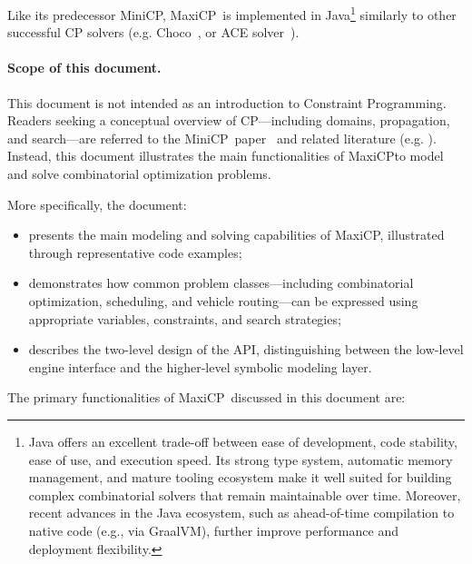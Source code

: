 \documentclass[11pt, a4paper]{scrartcl}
\newcommand{\choco}{\textsf{Choco}}
\newcommand{\maxicp}{\textsf{MaxiCP}}
\newcommand{\minicp}{\textsf{MiniCP}}
\begin{document}
Like its predecessor \minicp, \maxicp\ is implemented in Java\footnote{Java offers an excellent trade-off between ease of development, code stability, ease of use, and execution speed.
Its strong type system, automatic memory management, and mature tooling ecosystem
make it well suited for building complex combinatorial solvers that remain maintainable over time.
Moreover, recent advances in the Java ecosystem, such as ahead-of-time compilation to native code (e.g., via GraalVM), further improve performance and deployment flexibility.}
similarly to other successful CP solvers (e.g. \choco~\cite{choco}, or ACE solver~\cite{ace}).

\paragraph{Scope of this document.}
This document is not intended as an introduction to Constraint Programming.
Readers seeking a conceptual overview of CP---including domains, propagation, and search---are referred to the \minicp\ paper~\cite{Michel2021MiniCP} and related literature (e.g. \cite{lecoutre2013constraint}).
Instead, this document illustrates the main functionalities of \maxicp to model and solve combinatorial optimization problems.

More specifically, the document:
\begin{itemize}[leftmargin=*]
    \item presents the main modeling and solving capabilities of \maxicp, illustrated through representative code examples;
    \item demonstrates how common problem classes---including combinatorial optimization, scheduling, and vehicle routing---can be expressed using appropriate variables, constraints, and search strategies;
    \item describes the two-level design of the API, distinguishing between the low-level engine interface and the higher-level symbolic modeling layer.
\end{itemize}

\noindent
The primary functionalities of \maxicp\ discussed in this document are:
\end{document}
